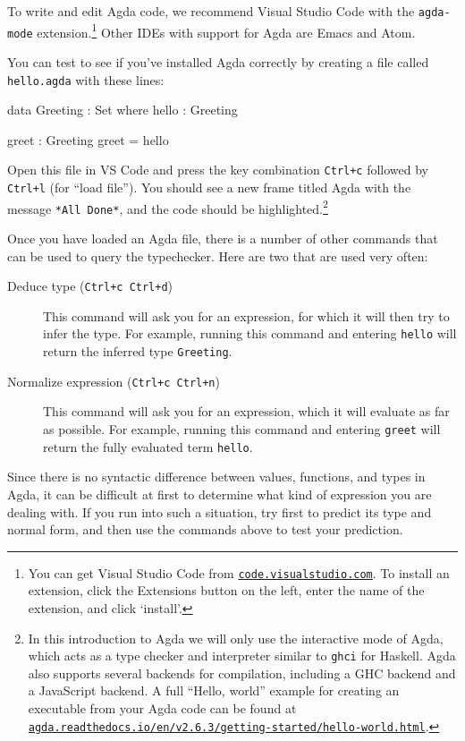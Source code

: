 \documentclass[a4paper,UKenglish]{tufte-handout}
\newcommand{\hrefu}[2]{\href{#1}{\nolinkurl{#2}}}
\theoremstyle{definition}
\begin{document}
To write and edit Agda code, we recommend Visual Studio Code with the
\texttt{agda-mode} extension.\footnote{You can get Visual Studio Code
from \hrefu{https://code.visualstudio.com/}{code.visualstudio.com}. To install an extension,
click the Extensions button on the left, enter the name of the
extension, and click `install'.} Other IDEs with support for Agda are
Emacs and Atom.

You can test to see if you've installed Agda correctly by creating a file
called \texttt{hello.agda} with these lines:

\begin{code}[number]
data Greeting : Set where
  hello : Greeting

greet : Greeting
greet = hello
\end{code}
Open this file in VS Code and press the key combination
\texttt{Ctrl+c} followed by \texttt{Ctrl+l} (for ``load file''). You
should see a new frame titled Agda with the message \texttt{*All
Done*}, and the code should be highlighted.\footnote{In this
introduction to Agda we will only use the interactive mode of Agda,
which acts as a type checker and interpreter similar to \texttt{ghci}
for Haskell. Agda also supports several backends for compilation,
including a GHC backend and a JavaScript backend. A full ``Hello,
world'' example for creating an executable from your Agda code can be
found at
\hrefu{https://agda.readthedocs.io/en/v2.6.3/getting-started/hello-world.html}{agda.readthedocs.io/en/v2.6.3/getting-started/hello-world.html}.}

Once you have loaded an Agda file, there is a number of other commands that
can be used to query the typechecker. Here are two that are used very often:

\begin{description}
\item[Deduce type (\texttt{Ctrl+c Ctrl+d})] This command will ask you
  for an expression, for which it will then try to infer the type. For
  example, running this command and entering \texttt{hello} will
  return the inferred type \texttt{Greeting}.
\item[Normalize expression (\texttt{Ctrl+c Ctrl+n})] This command will ask you
  for an expression, which it will evaluate as far as possible. For
  example, running this command and entering \texttt{greet} will
  return the fully evaluated term \texttt{hello}.
\end{description}

Since there is no syntactic difference between values, functions, and types in
Agda, it can be difficult at first to determine what kind of expression you are
dealing with. If you run into such a situation, try first to predict its type
and normal form, and then use the commands above to test your prediction.
\end{document}
